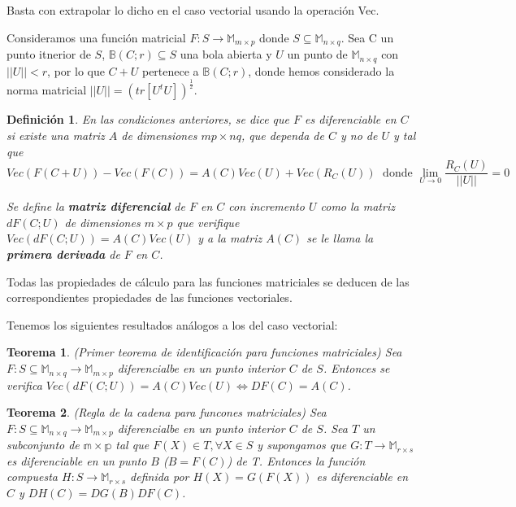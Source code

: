 \documentclass{article}
\theoremstyle{theorem-style}  %
\newtheorem{theorem}{Teorema}[section]  %
\theoremstyle{definition-style}
\newtheorem{definition}{Definición}[section]
\theoremstyle{example-style}
\theoremstyle{exercise-style}
\begin{document}
	Basta con extrapolar lo dicho en el caso vectorial usando la operación Vec.
	
	Consideramos una función matricial $F: S \rightarrow \mathbb{M}_{m\times p}$ donde $S \subseteq \mathbb{M}_{n\times q}$. Sea C un punto itnerior de $S$, $\mathbb{B}(C;r) \subseteq S$ una bola abierta y $U$ un punto de $\mathbb{M}_{n\times q}$ con $||U||<r$, por lo que $C+U$ pertenece a $\mathbb{B}(C;r)$, donde hemos considerado la norma matricial $||U||=(tr[U^tU])^{\frac{1}{2}}$.
	
	\begin{definition}
		\textit{	En las condiciones anteriores, se dice que $F$ es diferenciable en $C$ si existe una matriz $A$ de dimensiones $mp\times nq$, que dependa de $C$ y no de $U$ y tal que}
		$$Vec(F(C+U))-Vec(F(C))=A(C)Vec(U)+Vec(R_C(U))\; \text{ donde } \lim\limits_{U\rightarrow 0} \frac{R_C(U)}{||U||} = 0$$
		
		\textit{Se define la \textbf{matriz diferencial} de $F$ en $C$ con incremento $U$ como la matriz $dF(C;U)$ de dimensiones $m\times p$ que verifique $Vec(dF(C;U))=A(C)Vec(U)$ y a la matriz $A(C)$ se le llama la \textbf{primera derivada} de $F$ en $C$.}
	\end{definition}
	
	Todas las propiedades de cálculo para las funciones matriciales se deducen de las correspondientes propiedades de las funciones vectoriales.
	
	Tenemos los siguientes resultados análogos a los del caso vectorial:
	
	\begin{theorem} (Primer teorema de identificación para funciones matriciales)
		Sea $F:S\subseteq \mathbb{M}_{n \times q}\rightarrow \mathbb{M}_{m \times p}$ diferencialbe en un punto interior $C$ de $S$. Entonces se verifica $Vec(dF(C;U))=A(C)Vec(U) \Leftrightarrow DF(C)=A(C)$.	
	\end{theorem}
	
	\begin{theorem} (Regla de la cadena para funcones matriciales)
		Sea $F:S\subseteq \mathbb{M}_{n \times q}\rightarrow \mathbb{M}_{m \times p}$ diferencialbe en un punto interior $C$ de $S$. Sea $T$ un subconjunto de $\mathbb{m\times p}$ tal que $F(X)\in T, \forall X\in S$ y supongamos que $G:T\rightarrow \mathbb{M}_{r\times s}$ es diferenciable en un punto $B$ ($B=F(C)$) de T. Entonces la función compuesta $H:S\rightarrow \mathbb{M}_{r\times s}$ definida por $H(X)=G(F(X))$ es diferenciable en $C$ y $DH(C)=DG(B)DF(C)$.
	\end{theorem}
	
\end{document}

